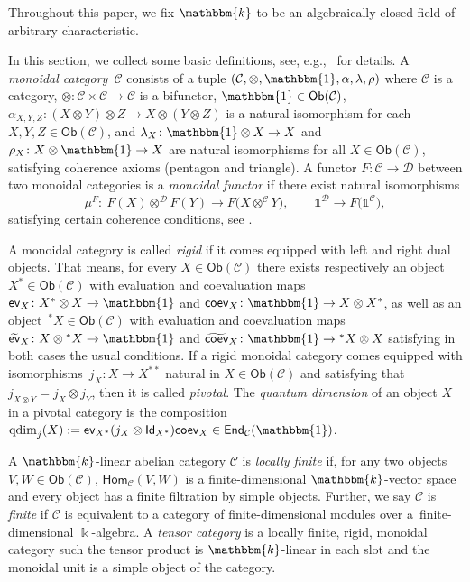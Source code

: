 \documentclass[10pt,a4paper]{amsart}
\numberwithin{equation}{section}
\newcommand{\coev}{\mathsf{coev}}
\newcommand{\coevr}{\widetilde{\mathsf{coev}}}
\newcommand{\ev}{\mathsf{ev}}
\newcommand{\evr}{\widetilde{\mathsf{ev}}}
\newcommand{\End}{\mathsf{End}}
\newcommand{\Hom}{\mathsf{Hom}}
\newcommand{\ide}{\mathsf{Id}}
\newcommand{\Ob}{\mathsf{Ob}}
\newcommand{\one}{\mathds{1}}
\newcommand{\cC}{\mathcal{C}}
\newcommand{\cD}{\mathcal{D}}
\begin{document}
Throughout this paper, we fix $\mathbbm{k}$ to be an algebraically closed field of arbitrary characteristic.

In this section, we collect some basic definitions, see, e.g.,~\cite{EGNO} for details. A \textit{monoidal category}~$\cC$ consists of a tuple $( \cC,\otimes, \mathbbm{1},\alpha,\lambda,\rho)$ where $\cC$ is a category, $\otimes \colon \cC \times \cC \to \cC$ is a bifunctor, $\mathbbm{1} \in \Ob (\cC)$, $\alpha_{X,Y,Z} \colon ( X \otimes Y) \otimes Z \to X \otimes ( Y \otimes Z)$ is a natural isomorphism for each $X, Y, Z \in \Ob (\cC)$, and $\lambda_X \colon \mathbbm{1} \otimes X \to X$ and $\rho_X \colon X \otimes \mathbbm{1} \to X$ are natural isomorphisms for all $X \in \Ob (\cC)$,
satisfying coherence axioms (pentagon and triangle).
A functor $F\colon \cC\to \cD$ between two monoidal categories is a \emph{monoidal functor} if there exist natural isomorphisms
\[\mu^F\colon\ F(X)\otimes^\cD F(Y)\to F\big(X\otimes^\cC Y\big), \qquad \one^\cD \to F\big(\one^\cC\big),\]
satisfying certain coherence conditions, see \cite[Definition~2.4.1]{EGNO}.

A monoidal category is called \textit{rigid} if it comes equipped with left and right dual objects. That means, for every $X \in \Ob (\cC)$ there exists respectively an object $X^* \in \Ob (\cC)$ with evaluation and coevaluation maps $\ev_X \colon X^* \otimes X \to \mathbbm{1}$ and $\coev_X \colon \mathbbm{1} \to X \otimes X^*$, as well as an object~${{}^*X \in \Ob (\cC)}$ with evaluation and coevaluation maps $\evr_X \colon X \otimes {}^*X \to \mathbbm{1}$ and $\coevr_X \colon \mathbbm{1} \to {}^*X \otimes X$ satisfying in both cases the usual conditions.
If a rigid monoidal category comes equipped with isomorphisms~$j_X \colon X \to X^{**}$ natural in $X \in \Ob(\cC)$ and satisfying that $j_{X \otimes Y}=j_X \otimes j_Y$, then it is called \textit{pivotal}. The \textit{quantum dimension} of an object $X$ in a pivotal category is the composition $\mathrm{qdim}_j (X):=\ev_{X^*} ( j_X \otimes \ide_{X^*} ) \coev_X \in \End_\cC ( \mathbbm{1} )$.

A $\mathbbm{k}$-linear abelian category $\cC$ is \textit{locally finite} if, for any two objects $V,W \in \Ob (\cC)$, $\Hom_\cC ( V,W)$ is a finite-dimensional $\mathbbm{k}$-vector space and every object has a finite filtration by simple objects. Further, we say $\cC$ is \textit{finite} if $\cC$ is equivalent to a category of finite-dimensional modules over a~finite-dimensional $\Bbbk$-algebra. A \textit{tensor category} is a locally finite, rigid, monoidal category such the tensor product is $\mathbbm{k}$-linear in each slot and the monoidal unit is a simple object of the category.
\end{document}

